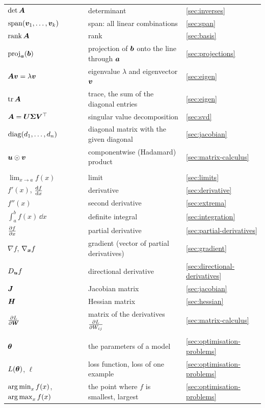 \begin{longtable}{@{}>{\raggedright\arraybackslash}p{3.6cm}
                   >{\raggedright\arraybackslash}p{7.3cm}
                   >{\raggedright\arraybackslash}p{3.0cm}@{}}
$\det\bm{A}$ & determinant & \cref{sec:inverses}\\
$\operatorname{span}(\bm{v}_1, \dots, \bm{v}_k)$ & span: all linear combinations & \cref{sec:span}\\
$\operatorname{rank}\bm{A}$ & rank & \cref{sec:basis}\\
$\operatorname{proj}_{\bm{a}}(\bm{b})$ & projection of $\bm{b}$ onto the line through $\bm{a}$ & \cref{sec:projections}\\
$\bm{A}\bm{v} = \lambda\bm{v}$ & eigenvalue $\lambda$ and eigenvector $\bm{v}$ & \cref{sec:eigen}\\
$\operatorname{tr}\bm{A}$ & trace, the sum of the diagonal entries & \cref{sec:eigen}\\
$\bm{A} = \bm{U}\bm{\Sigma}\bm{V}^\top$ & singular value decomposition & \cref{sec:svd}\\
$\operatorname{diag}(d_1, \dots, d_n)$ & diagonal matrix with the given diagonal & \cref{sec:jacobian}\\
$\bm{u} \odot \bm{v}$ & componentwise (Hadamard) product & \cref{sec:matrix-calculus}\\
\addlinespace
\multicolumn{3}{@{}l}{\textbf{\color{MLchapter}Calculus}}\\
$\lim_{x \to a}f(x)$ & limit & \cref{sec:limits}\\
$f'(x)$, $\frac{\mathrm{d} f}{\mathrm{d} x}$ & derivative & \cref{sec:derivative}\\
$f''(x)$ & second derivative & \cref{sec:extrema}\\
$\int_a^bf(x)\,\dd x$ & definite integral & \cref{sec:integration}\\
$\frac{\partial f}{\partial x}$ & partial derivative & \cref{sec:partial-derivatives}\\
$\nabla f$, $\nabla_{\bm{x}}f$ & gradient (vector of partial derivatives) & \cref{sec:gradient}\\
$D_{\bm{u}}f$ & directional derivative & \cref{sec:directional-derivatives}\\
$\bm{J}$ & Jacobian matrix & \cref{sec:jacobian}\\
$\bm{H}$ & Hessian matrix & \cref{sec:hessian}\\
$\frac{\partial L}{\partial \bm{W}}$ & matrix of the derivatives $\frac{\partial L}{\partial W_{ij}}$ & \cref{sec:matrix-calculus}\\
\addlinespace
\multicolumn{3}{@{}l}{\textbf{\color{MLchapter}Optimisation}}\\
$\bm{\theta}$ & the parameters of a model & \cref{sec:optimisation-problems}\\
$L(\bm{\theta})$, $\ell$ & loss function, loss of one example & \cref{sec:optimisation-problems}\\
$\operatorname*{arg\,min}_xf(x)$, $\operatorname*{arg\,max}_xf(x)$ & the point where $f$ is smallest, largest & \cref{sec:optimisation-problems}\\

\end{longtable}

